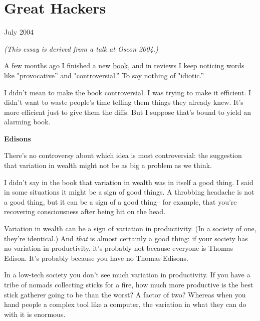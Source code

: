 \chapter{Great Hackers}


            
              
                


                  
                    July 2004

\emph{(This essay is derived from a talk at Oscon 2004.)}


                    A few months ago I finished a new
                    \href{http://www.amazon.com/exec/obidos/tg/detail/-/0596006624}{book}, and in reviews I keep noticing words like "provocative''
                    and "controversial.'' To say nothing of "idiotic.''

I
                    didn't mean to make the book controversial. I was trying to
                    make it efficient. I didn't want to waste people's time
                    telling them things they already knew. It's more efficient
                    just to give them the diffs. But I suppose that's bound to
                    yield an alarming book.

\textbf{Edisons}

There's no controversy about which idea is most
                    controversial: the suggestion that variation in wealth might
                    not be as big a problem as we think.

I didn't say
                    in the book that variation in wealth was in itself a good
                    thing. I said in some situations it might be a sign of good
                    things. A throbbing headache is not a good thing, but it can
                    be a sign of a good thing-- for example, that you're
                    recovering consciousness after being hit on the head.

Variation
                    in wealth can be a sign of variation in productivity. (In a
                    society of one, they're identical.) And \emph{that} is
                    almost certainly a good thing: if your society has no
                    variation in productivity, it's probably not because
                    everyone is Thomas Edison. It's probably because you have no
                    Thomas Edisons.

In a low-tech society you don't
                    see much variation in productivity. If you have a tribe of
                    nomads collecting sticks for a fire, how much more
                    productive is the best stick gatherer going to be than the
                    worst? A factor of two? Whereas when you hand people a
                    complex tool like a computer, the variation in what they can
                    do with it is enormous.

